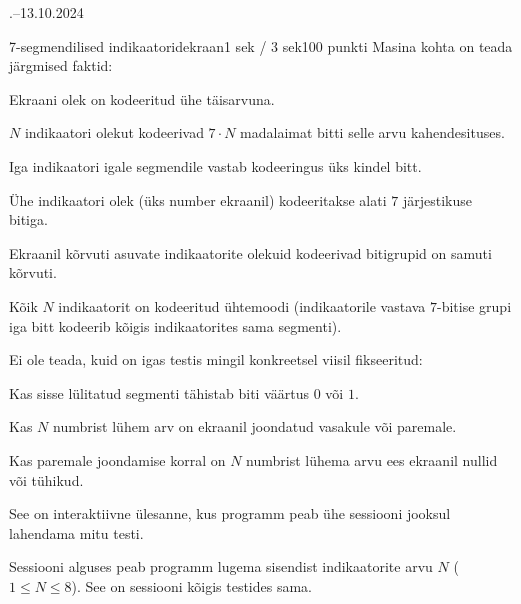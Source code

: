 \documentclass[a4paper,11pt]{article}
\begin{document}
\begin{ol}{\eio}{.--13.10.2024}{\yle}{}
\begin{yl}{6}{7-segmendilised indikaatorid}{ekraan}{1 sek / 3 sek}{100 punkti}
Masina kohta on teada järgmised faktid:
\begin{xitem}
\item Ekraani olek on kodeeritud ühe täisarvuna.
\item $N$ indikaatori olekut kodeerivad $7 \cdot N$ madalaimat bitti selle arvu kahendesituses.
\item Iga indikaatori igale segmendile vastab kodeeringus üks kindel bitt.
\item Ühe indikaatori olek (üks number ekraanil) kodeeritakse alati $7$ järjestikuse bitiga.
\item Ekraanil kõrvuti asuvate indikaatorite olekuid kodeerivad bitigrupid on samuti kõrvuti.
\item Kõik $N$ indikaatorit on kodeeritud ühtemoodi (indikaatorile vastava $7$-bitise grupi iga bitt kodeerib kõigis indikaatorites sama segmenti).
\end{xitem}
Ei ole teada, kuid on igas testis mingil konkreetsel viisil fikseeritud:
\begin{xitem}
\item Kas sisse lülitatud segmenti tähistab biti väärtus $0$ või $1$.
\item Kas $N$ numbrist lühem arv on ekraanil joondatud vasakule või paremale.
\item Kas paremale joondamise korral on $N$ numbrist lühema arvu ees ekraanil nullid või tühikud.
\end{xitem}

\suht See on interaktiivne ülesanne, kus programm peab ühe sessiooni jooksul lahendama mitu testi.

Sessiooni alguses peab programm lugema sisendist indikaatorite arvu $N$ ($1 \le N \le 8$). See on sessiooni kõigis testides sama.


\end{yl}
\end{ol}
\end{document}
